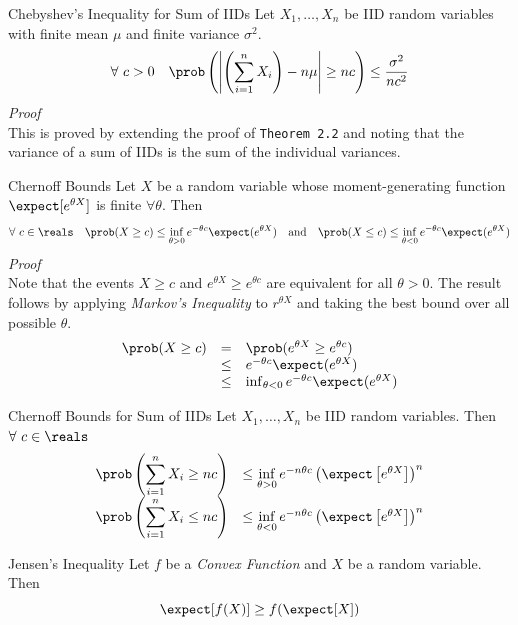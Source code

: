 \documentclass[11pt,a4paper]{article}
\begin{document}
\begin{theorem}{Chebyshev's Inequality for Sum of IIDs}
  Let $X_1,\dots,X_n$ be IID random variables with finite mean $\mu$ and finite variance $\sigma^2$.
  \[ \forall\ c>0\quad\prob\left(\left|\left(\sum_{i=1}^nX_i\right)-n\mu\right|\geq nc\right)\leq\frac{\sigma^2}{nc^2} \]
  \textit{Proof}\\
  This is proved by extending the proof of \texttt{Theorem 2.2} and noting that the variance of a sum of IIDs is the sum of the individual variances.
\end{theorem}

\begin{theorem}{Chernoff Bounds}
  Let $X$ be a random variable whose moment-generating function $\expect[e^{\theta X}]$ is finite $\forall\theta$. Then
  \[ \forall\ c\in\reals\quad\prob(X\geq c)\leq\inf_{\theta>0}e^{-\theta c}\expect(e^{\theta X})\quad\text{and}\quad\prob(X\leq c)\leq\inf_{\theta<0}e^{-\theta c}\expect(e^{\theta X}) \]
  \textit{Proof}\\
  Note that the events $X\geq c$ and $e^{\theta X}\geq e^{\theta c}$ are equivalent for all $\theta>0$. The result follows by applying \textit{Markov's Inequality} to $r^{\theta X}$ and taking the best bound over all possible $\theta$.
  \[\begin{array}{rcl}
    \prob(X\geq c)&=&\prob(e^{\theta X}\geq e^{\theta c})\\
    &\leq&e^{-\theta c}\expect(e^{\theta X})\\
    &\leq&\inf_{\theta<0}e^{-\theta c}\expect(e^{\theta X}) %
  \end{array}\]
\end{theorem}

\begin{theorem}{Chernoff Bounds for Sum of IIDs}
  Let $X_1,\dots,X_n$ be IID random variables. Then $\forall\ c\in\reals$
  \[\begin{array}{rcl}
    {\displaystyle\prob\left(\sum_{i=1}^nX_i\geq nc\right)}&\leq\inf\limits_{\theta>0}e^{-n\theta c}\left(\expect\left[e^{\theta X}\right]\right)^n\\
    {\displaystyle\prob\left(\sum_{i=1}^nX_i\leq nc\right)}&\leq\inf\limits_{\theta<0}e^{-n\theta c}\left(\expect\left[e^{\theta X}\right]\right)^n
  \end{array}\]
\end{theorem}

\begin{theorem}{Jensen's Inequality}
  Let $f$ be a \textit{Convex Function} and $X$ be a random variable. Then
  \[ \expect[f(X)]\geq f(\expect[X]) \]
\end{theorem}
\end{document}

